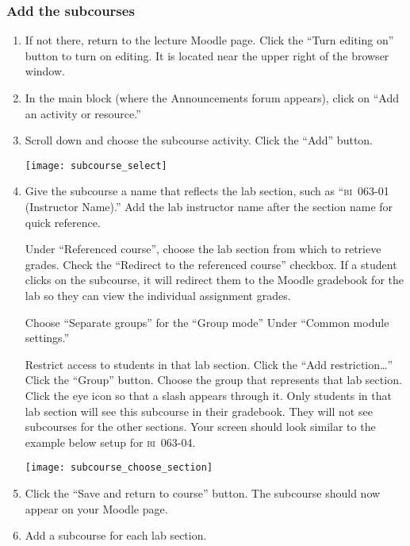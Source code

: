 \documentclass[12pt]{article}
\begin{document}
\subsubsection*{Add the subcourses}
 
\begin{enumerate}
	\item If not there, return to the lecture Moodle page. Click the ``Turn editing on'' button to turn on editing. It is located near the upper right of the browser window.
	
	\item In the main block (where the Announcements forum appears), click on “Add an activity or resource.”
	
	\item Scroll down and choose the subcourse activity. Click the “Add” button.
	
	{\centering
		\texttt{[image: subcourse\_select]}\par
	}

	\item Give the subcourse a name that reflects the lab section, such as “\textsc{bi}~063-01 (Instructor Name).” Add the lab instructor name after the section name for quick reference. 

	Under “Referenced course”, choose the lab section from which to retrieve grades. Check the “Redirect to the referenced course” checkbox. If a student clicks on the subcourse, it will redirect them to the Moodle gradebook for the lab so they can view the individual assignment grades.
	
	Choose “Separate groups” for the “Group mode” Under “Common module settings.”
	
	Restrict access to students in that lab section. Click the “Add restriction\dots” Click the “Group” button. Choose the group that represents that lab section. Click the eye icon so that a slash appears through it. Only students in that lab section will see this subcourse in their gradebook. They will not see subcourses for the other sections. Your screen should look similar to the example below setup for \textsc{bi}~063-04. 
	
	{\centering
		\texttt{[image: subcourse\_choose\_section]}\par
	}
	
	\item Click the “Save and return to course” button. The subcourse should now appear on your Moodle page. 
	
	\item Add a subcourse for each lab section.

\end{enumerate}
\end{document}
